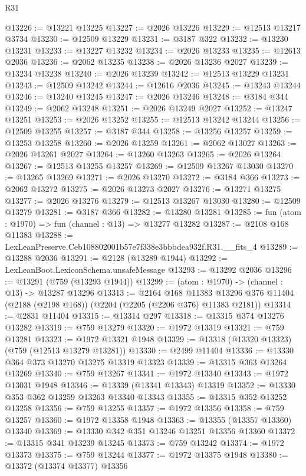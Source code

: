 \begin{lexlean}{R31}
\begin{coremodule}
@13226 := @13221 @13225
@13227 := @2026 @13226
@13229 := @12513 @13217 @3734
@13230 := @12509 @13229
@13231 := @3187 @322
@13232 := @13230 @13231
@13233 := @13227 @13232
@13234 := @2026 @13233
@13235 := @12613 @2036
@13236 := @2062 @13235
@13238 := @2026 @13236 @2027
@13239 := @13234 @13238
@13240 := @2026 @13239
@13242 := @12513 @13229 @13231
@13243 := @12509 @13242
@13244 := @12616 @2036
@13245 := @13243 @13244
@13246 := @13240 @13245
@13247 := @2026 @13246
@13248 := @3184 @344
@13249 := @2062 @13248
@13251 := @2026 @13249 @2027
@13252 := @13247 @13251
@13253 := @2026 @13252
@13255 := @12513 @13242 @13244
@13256 := @12509 @13255
@13257 := @3187 @344
@13258 := @13256 @13257
@13259 := @13253 @13258
@13260 := @2026 @13259
@13261 := @2062 @13027
@13263 := @2026 @13261 @2027
@13264 := @13260 @13263
@13265 := @2026 @13264
@13267 := @12513 @13255 @13257
@13269 := @12509 @13267 @13030
@13270 := @13265 @13269
@13271 := @2026 @13270
@13272 := @3184 @366
@13273 := @2062 @13272
@13275 := @2026 @13273 @2027
@13276 := @13271 @13275
@13277 := @2026 @13276
@13279 := @12513 @13267 @13030
@13280 := @12509 @13279
@13281 := @3187 @366
@13282 := @13280 @13281
@13285 := fun (atom : @1970) => fun (channel : @13) => @13277 @13282
@13287 := @2108 @168 @11383
@13288 := LexLeanPreserve.Ceb108802001b57e7f338e3bbbdea932f.R31.__fits_4
@13289 := @13288 @2036
@13291 := @2128 (@13289 @1944)
@13292 := LexLeanBoot.LexiconSchema.unsafeMessage
@13293 := @13292 @2036
@13296 := @13291 (@759 (@13293 @1944))
@13299 := (atom : @1970) -> (channel : @13) -> @13287 @13296
@13313 := @2164
    @168
    @11383
    @13296
    @376
    @11404
    (@2188 (@2198 @168))
    (@2204 (@2205 (@2206 @376) @11383 @2181))
@13314 := @2831 @11404
@13315 := @13314 @297
@13318 := @13315 @374 @13276 @13282
@13319 := @759 @13279
@13320 := @1972 @13319
@13321 := @759 @13281
@13323 := @1972 @13321 @1948
@13329 := @13318 (@13320 @13323) (@759 (@12513 @13279 @13281))
@13330 := @2499 @11404
@13336 := @13330 @364 @373 @13270 @13275 @13319 @13323
@13339 := @13315 @363 @13264 @13269
@13340 := @759 @13267
@13341 := @1972 @13340
@13343 := @1972 @13031 @1948
@13346 := @13339 (@13341 @13343) @13319
@13352 := @13330 @353 @362 @13259 @13263 @13340 @13343
@13355 := @13315 @352 @13252 @13258
@13356 := @759 @13255
@13357 := @1972 @13356
@13358 := @759 @13257
@13360 := @1972 @13358 @1948
@13363 := @13355 (@13357 @13360) @13340
@13369 := @13330 @342 @351 @13246 @13251 @13356 @13360
@13372 := @13315 @341 @13239 @13245
@13373 := @759 @13242
@13374 := @1972 @13373
@13375 := @759 @13244
@13377 := @1972 @13375 @1948
@13380 := @13372 (@13374 @13377) @13356

\end{coremodule}
\end{lexlean}
